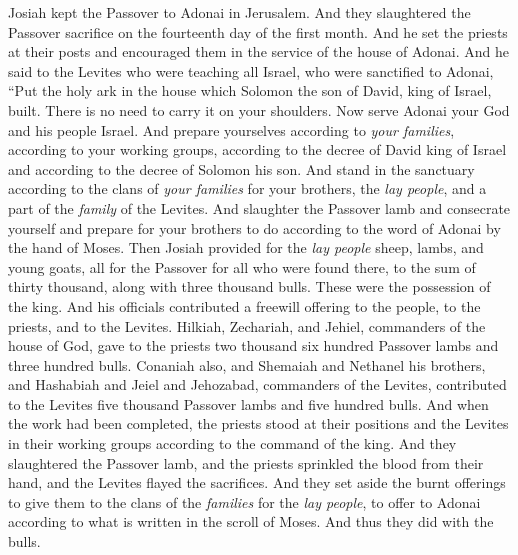 \begin{biblechapter} %
 Josiah kept the Passover to Adonai in Jerusalem. And they slaughtered the Passover sacrifice on the fourteenth day of the first month.
\verse And he set the priests at their posts and encouraged them in the service of the house of Adonai.
\verse And he said to the Levites who were teaching all Israel, who were sanctified to Adonai, “Put the holy ark in the house which Solomon the son of David, king of Israel, built. There is no need to carry it on your shoulders. Now serve Adonai your God and his people Israel.
\verse And prepare yourselves according to \textit{your families}, according to your working groups, according to the decree of David king of Israel and according to the decree of Solomon his son.
\verse And stand in the sanctuary according to the clans of \textit{your families} for your brothers, the \textit{lay people}, and a part of the \textit{family} of the Levites.
\verse And slaughter the Passover lamb and consecrate yourself and prepare for your brothers to do according to the word of Adonai by the hand of Moses.
\verse Then Josiah provided for the \textit{lay people} sheep, lambs, and young goats, all for the Passover for all who were found there, to the sum of thirty thousand, along with three thousand bulls. These were the possession of the king.
\verse And his officials contributed a freewill offering to the people, to the priests, and to the Levites. Hilkiah, Zechariah, and Jehiel, commanders of the house of God, gave to the priests two thousand six hundred Passover lambs and three hundred bulls.
\verse Conaniah also, and Shemaiah and Nethanel his brothers, and Hashabiah and Jeiel and Jehozabad, commanders of the Levites, contributed to the Levites five thousand Passover lambs and five hundred bulls.
\verse And when the work had been completed, the priests stood at their positions and the Levites in their working groups according to the command of the king.
\verse And they slaughtered the Passover lamb, and the priests sprinkled the blood from their hand, and the Levites flayed the sacrifices.
\verse And they set aside the burnt offerings to give them to the clans of the \textit{families} for the \textit{lay people}, to offer to Adonai according to what is written in the scroll of Moses. And thus they did with the bulls.

\end{biblechapter}

